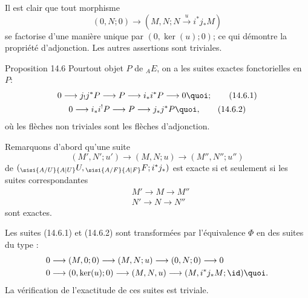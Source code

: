 \documentclass[10pt]{../fichiers-configuration-latex/smfart}
\begin{document}
Il est clair que tout morphisme
$$
(0,N;0)\longrightarrow (M,N;N\xrightarrow{u}i^{\ast}j_{\ast}M)
$$
se factorise d'une manière unique par $(0,\ker(u);0)$; ce qui
démontre la propriété d'adjonction. Les autres assertions sont
triviales.

\begin{enonce*}{Proposition 14.6}
Pour\pageoriginale tout objet $P$ de ${}_AE$, on a les suites
exactes fonctorielles en $P$:
\begin{gather}
0\longrightarrow j_{!}j^{\ast}P\longrightarrow P\longrightarrow
i_{\ast}i^{\ast}P\longrightarrow 0{\quoi};\tag{14.6.1}\\
0\longrightarrow i_{\ast}i^{!}P\longrightarrow P\longrightarrow
j_{\ast}j^{\ast}P{\quoi},\tag{14.6.2}
\end{gather}
où les flèches non triviales sont les flèches d'adjonction.
\end{enonce*}

Remarquons d'abord qu'une suite
$$
(M', N'; u')\longrightarrow (M,N;u)\longrightarrow (M'',N'';u'')
$$
de $({}_{\sisi{A/U}{A|U}}U, {}_{\sisi{A/F}{A|F}}F; i^{\ast}j_{\ast})$ est exacte si et
seulement si les suites correspondantes
\begin{align*}
& M'\longrightarrow M\longrightarrow M''\\
& N'\longrightarrow N\longrightarrow N''
\end{align*}
sont exactes.

Les suites (14.6.1) et (14.6.2) sont transformées par
l'équivalence $\Phi$ en des suites du type :
\begin{align*}
& 0\longrightarrow (M,0;0)\longrightarrow (M,N;u)\longrightarrow
(0,N;0)\longrightarrow 0\\
& 0\longrightarrow (0,\ker(u);0)\longrightarrow
(M,N,u)\longrightarrow (M,i^{\ast}j_{\ast}M; \id){\quoi}.
\end{align*}
La vérification de l'exactitude de ces suites est triviale.

\setcounter{subsection}{6}
\end{document}

